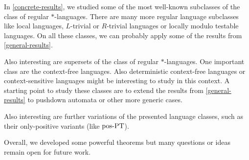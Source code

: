 In \cref{concrete-results}, we studied some of the most well-known subclasses of the class of regular $*$-languages. There are many more regular language subclasses like local languages, $L$-trivial or $R$-trivial languages or locally modulo testable languages. On all these classes, we can probably apply some of the results from \cref{general-results}.

Also interesting are supersets of the class of regular $*$-languages. One important class are the context-free languages. Also deterministic context-free languages or context-sensitive languages might be interesting to study in this context. A starting point to study these classes are to extend the results from \cref{general-results} to pushdown automata or other more generic cases.

Also interesting are further variations of the presented language classes, such as their only-positive variants (like $\textup{\textrm{pos-PT}}$).

Overall, we developed some powerful theorems but many questions or ideas remain open for future work.
